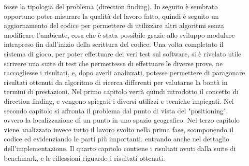 fosse la tipologia del problema (direction finding). In seguito è sembrato opportuno poter misurare la qualità del lavoro fatto, quindi è seguito un aggiornamento del codice per permettere di utilizzare altri algoritmi senza modificare l'ambiente, cosa che è stata possibile grazie allo sviluppo modulare intrapreso fin dall'inizio della scrittura del codice. Una volta completato il sistema di gioco, per poter effettuare dei veri test sul software, si è rivelato utile scrivere una suite di test che permettesse di effettuare le diverse prove, ne raccogliesse i risultati, e, dopo averli analizzati, potesse permettere di paragonare risultati ottenuti da algoritmo di ricerca differenti per valutarne la bontà in termini di prestazioni.
Nel primo capitolo verrà quindi introdotto il concetto di direction finding, e vengono spiegati i diversi utilizzi e tecniche impiegati. Nel secondo capitolo si affronta il problema dal punto di vista del "positioning", ovvero la localizzazione di un punto in uno spazio geografico. Nel terzo capitolo viene analizzato invece tutto il lavoro svolto nella prima fase, scomponendo il codice ed evidenziando le parti più importanti, entrando anche nel dettaglio dell'implementazione. Il quarto capitolo contiene i risultati avuti dalla suite di benchmark, e le riflessioni riguardo i risultati ottenuti.